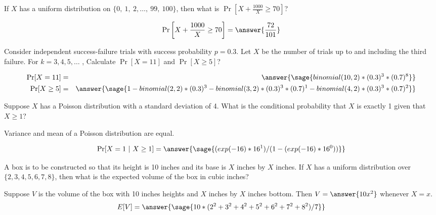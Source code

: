 \documentclass{ximera}
\begin{document}
\begin{problem}
If $X$ has a uniform distribution on $\{0,~1,~2,\ldots,~99,~100\}$, then what is $\Pr\left[X+\frac{1000}{X}\geq 70\right]$? 

\begin{prompt}
$$\Pr\left[X+\frac{1000}{X}\geq 70\right]=\answer{\frac{72}{101}}$$
\end{prompt}
\end{problem}


\begin{problem}
 Consider independent success-failure trials with success probability $p=0.3$. Let $X$ be the number of trials up to and including the third failure. For $k = 3, 4, 5, \ldots$ , Calculate $\Pr[X=11]$ and $\Pr[X\geq 5]$?

\begin{prompt}%
\begin{eqnarray*}
\Pr[X=11]&=&\answer{\sage{binomial(10,2)*(0.3)^3*(0.7)^8}} \\
\Pr[X\geq 5]&=&\answer{\sage{1-binomial(2,2)*(0.3)^3-binomial(3,2)*(0.3)^3*(0.7)^1-binomial(4,2)*(0.3)^3*(0.7)^2}}
\end{eqnarray*}
\end{prompt}
\end{problem}


\begin{problem}
Suppose $X$ has a Poisson distribution with a standard deviation of 4. What is the conditional probability that $X$ is exactly 1 given that $X\geq1$? 

\begin{hint}
Variance and mean of a Poisson distribution are equal.
\end{hint}

\begin{prompt}
        $$\Pr[X=1~|~X\geq 1] =\answer{\sage{(exp(-16)*16^1)/(1-(exp(-16)*16^0))}}$$
\end{prompt}
\end{problem}

\begin{problem}
A box is to be constructed so that its height is 10 inches and its base is $X$ inches by $X$ inches. If $X$ has a uniform distribution over $\{2,3,4,5,6,7,8\}$, then what is the expected volume of the box in cubic inches? 
\begin{prompt}
Suppose $V$ is the volume of the box with 10 inches heights and $X$ inches by $X$ inches bottom. Then $V=\answer{10x^2}$ whenever $X=x$.
$$E[V]=\answer{\sage{10*(2^2+3^2+4^2+5^2+6^2+7^2+8^2)/7}}
$$
\end{prompt}

\end{problem}
\end{document}
